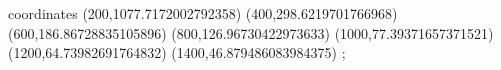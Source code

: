 \begin{axis}[
	xlabel={\Huge{minsup}},
	ylabel={\Huge{runtime}},
	xmin=200, xmax=1400,
\addplot+  [red]
	coordinates {
(200,1077.7172002792358)
(400,298.6219701766968)
(600,186.86728835105896)
(800,126.96730422973633)
(1000,77.39371657371521)
(1200,64.73982691764832)
(1400,46.879486083984375)
	};   
\end{axis}